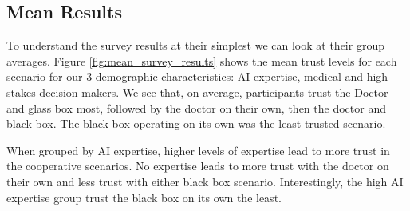 \documentclass[manuscript,screen,review]{acmart}
\begin{document}





\subsection{Mean Results}

To understand the survey results at their simplest we can look at their group averages. Figure \ref{fig:mean_survey_results} shows the mean trust levels for each scenario for our 3 demographic characteristics: AI expertise, medical and high stakes decision makers. We see that, on average, participants trust the Doctor and glass box most, followed by the doctor on their own, then the doctor and black-box. The black box operating on its own was the least trusted scenario. 

When grouped by AI expertise, higher levels of expertise lead to more trust in the cooperative scenarios. No expertise leads to more trust with the doctor on their own and less trust with either black box scenario. Interestingly, the high AI expertise group trust the black box on its own the least.
\end{document}
